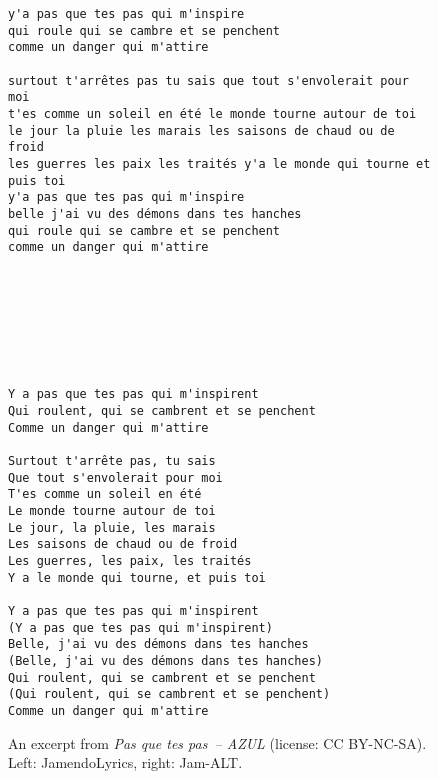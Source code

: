 \documentclass{article}
\begin{document}
\begin{figure}
\centering
    \begin{minipage}[t]{0.51\linewidth}
\begin{lstlisting}
y'a pas que tes pas qui m'inspire
qui roule qui se cambre et se penchent
comme un danger qui m'attire

surtout t'arrêtes pas tu sais que tout s'envolerait pour moi
t'es comme un soleil en été le monde tourne autour de toi
le jour la pluie les marais les saisons de chaud ou de froid
les guerres les paix les traités y'a le monde qui tourne et puis toi
y'a pas que tes pas qui m'inspire
belle j'ai vu des démons dans tes hanches
qui roule qui se cambre et se penchent
comme un danger qui m'attire








\end{lstlisting}
    \end{minipage}
    \hfill
    \begin{minipage}[t]{0.46\linewidth}
\begin{lstlisting}
Y a pas que tes pas qui m'inspirent
Qui roulent, qui se cambrent et se penchent
Comme un danger qui m'attire

Surtout t'arrête pas, tu sais
Que tout s'envolerait pour moi
T'es comme un soleil en été
Le monde tourne autour de toi
Le jour, la pluie, les marais
Les saisons de chaud ou de froid
Les guerres, les paix, les traités
Y a le monde qui tourne, et puis toi

Y a pas que tes pas qui m'inspirent
(Y a pas que tes pas qui m'inspirent)
Belle, j'ai vu des démons dans tes hanches
(Belle, j'ai vu des démons dans tes hanches)
Qui roulent, qui se cambrent et se penchent
(Qui roulent, qui se cambrent et se penchent)
Comme un danger qui m'attire
\end{lstlisting}
    \end{minipage}
    \caption{An excerpt from \emph{Pas que tes pas~-- AZUL} (license: CC BY-NC-SA). Left: JamendoLyrics, right: Jam-ALT.}
    \label{fig:lyrics-ex-2}
\end{figure}
\end{document}

